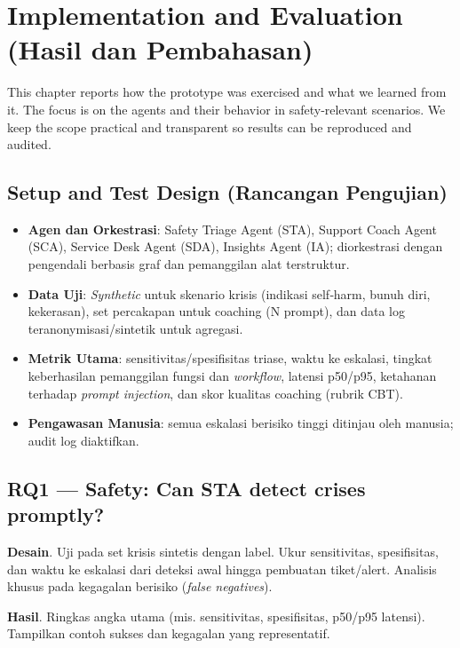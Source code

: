 \chapter{Implementation and Evaluation (Hasil dan Pembahasan)}

This chapter reports how the prototype was exercised and what we learned from it. The focus is on the agents and their behavior in safety‑relevant scenarios. We keep the scope practical and transparent so results can be reproduced and audited.

\section{Setup and Test Design (Rancangan Pengujian)}
\label{sec:setup}

\begin{itemize}
  \item \textbf{Agen dan Orkestrasi}: Safety Triage Agent (STA), Support Coach Agent (SCA), Service Desk Agent (SDA), Insights Agent (IA); diorkestrasi dengan pengendali berbasis graf dan pemanggilan alat terstruktur.
  \item \textbf{Data Uji}: \textit{Synthetic} untuk skenario krisis (indikasi self‑harm, bunuh diri, kekerasan), set percakapan untuk coaching (N prompt), dan data log teranonymisasi/sintetik untuk agregasi.
  \item \textbf{Metrik Utama}: sensitivitas/spesifisitas triase, waktu ke eskalasi, tingkat keberhasilan pemanggilan fungsi dan \textit{workflow}, latensi p50/p95, ketahanan terhadap \textit{prompt injection}, dan skor kualitas coaching (rubrik CBT).
  \item \textbf{Pengawasan Manusia}: semua eskalasi berisiko tinggi ditinjau oleh manusia; audit log diaktifkan.
\end{itemize}

\section{RQ1 — Safety: Can STA detect crises promptly?}
\label{sec:rq1}

\textbf{Desain}. Uji pada set krisis sintetis dengan label. Ukur sensitivitas, spesifisitas, dan waktu ke eskalasi dari deteksi awal hingga pembuatan tiket/alert. Analisis khusus pada kegagalan berisiko (\textit{false negatives}).

\textbf{Hasil}. Ringkas angka utama (mis. sensitivitas, spesifisitas, p50/p95 latensi). Tampilkan contoh sukses dan kegagalan yang representatif.

